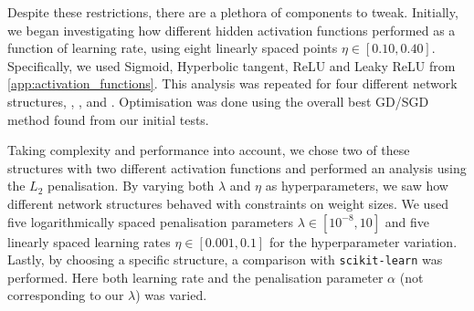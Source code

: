     Despite these restrictions, there are a plethora of components to tweak. Initially, we began investigating how different hidden activation functions performed as a function of learning rate, using eight linearly spaced points $\eta \in [0.10, 0.40]$. Specifically, we used Sigmoid, Hyperbolic tangent, ReLU and Leaky ReLU from \cref{app:activation_functions}. This analysis was repeated for four different network structures, , ,  and . Optimisation was done using the overall best GD/SGD method found from our initial tests.  

    Taking complexity and performance into account, we chose two of these structures with two different activation functions and performed an analysis using the $L_2$ penalisation. By varying both $\lambda$ and $\eta$ as hyperparameters, we saw how different network structures behaved with constraints on weight sizes. We used five logarithmically spaced penalisation parameters $\lambda \in [10^{-8}, 10]$ and five linearly spaced learning rates $\eta \in [0.001, 0.1]$ for the hyperparameter variation.  Lastly, by choosing a specific structure, a comparison with \verb|scikit-learn| was performed. Here both learning rate and the penalisation parameter $\alpha$ (not corresponding to our $\lambda$) was varied. 